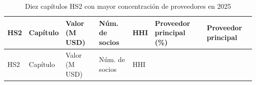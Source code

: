 \documentclass[
]{article}
\begin{document}
\begin{longtable}[]{@{}
  >{\raggedright\arraybackslash}p{}
  >{\raggedright\arraybackslash}p{}
  >{\raggedleft\arraybackslash}p{}
  >{\raggedleft\arraybackslash}p{}
  >{\raggedleft\arraybackslash}p{}
  >{\raggedleft\arraybackslash}p{}
  >{\raggedright\arraybackslash}p{}@{}}
\caption{Diez capítulos HS2 con mayor concentración de proveedores en
2025}\tabularnewline
\toprule\noalign{}
\begin{minipage}[b]{\linewidth}\raggedright
HS2
\end{minipage} & \begin{minipage}[b]{\linewidth}\raggedright
Capítulo
\end{minipage} & \begin{minipage}[b]{\linewidth}\raggedleft
Valor (M USD)
\end{minipage} & \begin{minipage}[b]{\linewidth}\raggedleft
Núm. de socios
\end{minipage} & \begin{minipage}[b]{\linewidth}\raggedleft
HHI
\end{minipage} & \begin{minipage}[b]{\linewidth}\raggedleft
Proveedor principal (\%)
\end{minipage} & \begin{minipage}[b]{\linewidth}\raggedright
Proveedor principal
\end{minipage} \\
\midrule\noalign{}
\endfirsthead
\toprule\noalign{}
\begin{minipage}[b]{\linewidth}\raggedright
HS2
\end{minipage} & \begin{minipage}[b]{\linewidth}\raggedright
Capítulo
\end{minipage} & \begin{minipage}[b]{\linewidth}\raggedleft
Valor (M USD)
\end{minipage} & \begin{minipage}[b]{\linewidth}\raggedleft
Núm. de socios
\end{minipage} & \begin{minipage}[b]{\linewidth}\raggedleft
HHI
\end{minipage} & \begin{minipage}[b]{\linewidth}\raggedleft

\end{minipage}
\end{longtable}
\end{document}
